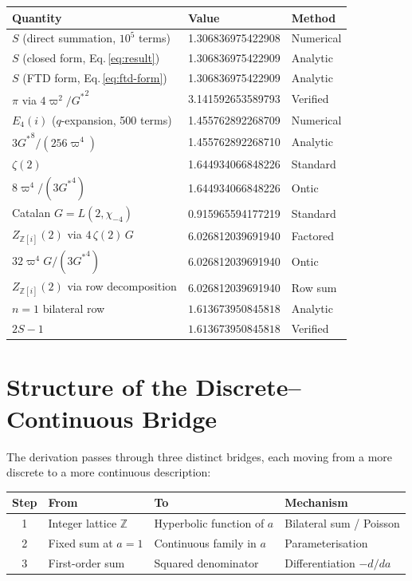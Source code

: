 \documentclass[12pt]{article}
\newcommand{\Z}{\mathbb{Z}}
\begin{document}
\begin{center}
\begin{tabular}{lll}
\toprule
\textbf{Quantity} & \textbf{Value} & \textbf{Method}\\
\midrule
$S$ (direct summation, $10^5$ terms) & 1.306836975422908 & Numerical\\
$S$ (closed form, Eq.\,\ref{eq:result}) & 1.306836975422909 & Analytic\\
$S$ (FTD form, Eq.\,\ref{eq:ftd-form}) & 1.306836975422909 & Analytic\\
$\pi$ via $4\varpi^2/{G^{*}}^2$ & 3.141592653589793 & Verified\\
$E_4(i)$ ($q$-expansion, 500 terms) & 1.455762892268709 & Numerical\\
$3{G^{*}}^8/(256\varpi^4)$ & 1.455762892268710 & Analytic\\
\midrule
$\zeta(2)$ & 1.644934066848226 & Standard\\
$8\varpi^4/(3{G^{*}}^4)$ & 1.644934066848226 & Ontic\\
Catalan $G = L(2,\chi_{-4})$ & 0.915965594177219 & Standard\\
$Z_{\Z[i]}(2)$ via $4\,\zeta(2)\,G$ & 6.026812039691940 & Factored\\
$32\varpi^4 G/(3{G^{*}}^4)$ & 6.026812039691940 & Ontic\\
$Z_{\Z[i]}(2)$ via row decomposition & 6.026812039691940 & Row sum\\
$n\!=\!1$ bilateral row & $1.613673950845818$ & Analytic\\
$2S-1$ & $1.613673950845818$ & Verified\\
\bottomrule
\end{tabular}
\end{center}

\section{Structure of the Discrete--Continuous Bridge}\label{sec:bridge-structure}

The derivation passes through three distinct bridges, each moving from a
more discrete to a more continuous description:

\medskip
\begin{center}
\begin{tabular}{clll}
\toprule
\textbf{Step} & \textbf{From} & \textbf{To} & \textbf{Mechanism}\\
\midrule
1 & Integer lattice $\Z$ & Hyperbolic function of $a$ & Bilateral sum / Poisson\\
2 & Fixed sum at $a=1$ & Continuous family in $a$ & Parameterisation\\
3 & First-order sum & Squared denominator & Differentiation $-d/da$\\
\bottomrule
\end{tabular}
\end{center}
\medskip
\end{document}
